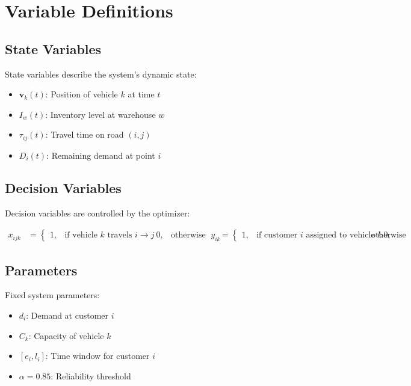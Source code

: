 \section{Variable Definitions}

\subsection{State Variables}

State variables describe the system's dynamic state:

\begin{itemize}
\item $\mathbf{v}_k(t)$: Position of vehicle $k$ at time $t$
\item $I_w(t)$: Inventory level at warehouse $w$
\item $\tau_{ij}(t)$: Travel time on road $(i,j)$
\item $D_i(t)$: Remaining demand at point $i$
\end{itemize}

\subsection{Decision Variables}

Decision variables are controlled by the optimizer:

\begin{align}
x_{ijk} &= \begin{cases} 
1, & \text{if vehicle } k \text{ travels } i \to j \
0, & \text{otherwise}
\end{cases} \label{eq:route_decision} \
y_{ik} &= \begin{cases}
1, & \text{if customer } i \text{ assigned to vehicle } k \
0, & \text{otherwise}
\end{cases} \label{eq:assignment}
\end{align}

\subsection{Parameters}

Fixed system parameters:

\begin{itemize}
\item $d_i$: Demand at customer $i$
\item $C_k$: Capacity of vehicle $k$
\item $[e_i, l_i]$: Time window for customer $i$
\item $\alpha = 0.85$: Reliability threshold
\end{itemize}

\label{sec:variables}
